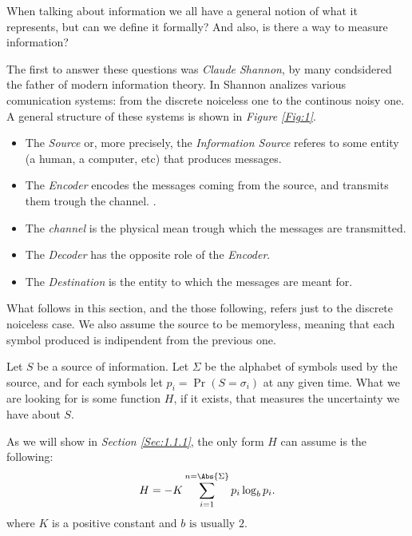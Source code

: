 \documentclass{subfiles}
\begin{document}
    When talking about information we all have a general notion of what it represents,
        but can we define it formally? And also, is there a way to measure information?

    The first to answer these questions was \emph{Claude Shannon}, 
        by many condsidered the father of modern information theory.
    In \cite{ShannonEntropy} Shannon analizes various comunication systems:
        from the discrete noiceless one to the continous noisy one.
    A general structure of these systems is shown in \emph{Figure \ref{Fig:1}}.
    

    \begin{itemize}
        \item The \emph{Source} or, more precisely, 
            the \emph{Information Source} referes to some entity
            (a human, a computer, etc) that produces messages.

        \item The \emph{Encoder} encodes the messages coming from the source,
            and transmits them trough the channel.
.
        \item The \emph{channel} is the physical mean trough which the messages
            are transmitted.

        \item The \emph{Decoder} has the opposite role of the \emph{Encoder}.
        \item The \emph{Destination} is the entity to which the messages are meant for.
    \end{itemize}

    \begin{remark*}
        What follows in this section, and the those following,
        refers just to the discrete noiceless case. 
        We also assume the source to be memoryless, 
        meaning that each symbol produced is indipendent from the previous one.
    \end{remark*}

    Let \(S\) be a source of information. 
    Let \(\Sigma\) be the alphabet of symbols used by the source,
    and for each symbols let \(p_{i} = \Pr(S = \sigma_{i})\) at any given time.
    What we are looking for is some function \(H\), if it exists,
    that measures the uncertainty we have about \(S\).

    As we will show in \emph{Section \ref{Sec:1.1.1}}, 
        the only form \(H\) can assume is the following:
    \begin{equation}\label{Eq:1}
        H = -K \sum_{i = 1}^{n = \Abs{\Sigma}}{p_{i} \log_{b} p_{i}}.
    \end{equation}
    where \(K\) is a positive constant and \(b \text{ is usually } 2\).
\end{document}
